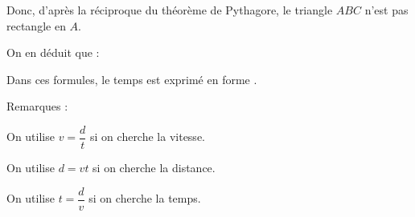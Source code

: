 \bigskip 

Donc, d'après la réciproque du théorème de Pythagore, le triangle $ABC$ n'est pas rectangle en $A$.                                
  
\newpage  

                 
                 

\begin{labeling}{On en déduit que :} 
\item [On en déduit que :] 
\item [et :]  
\end{labeling}    

\medskip

Dans ces formules, le temps est exprimé en forme .

\begin{labeling}[$\bullet$]{Remarques : }
\item [\underline{Remarques} : ] On utilise $v=\dfrac{d}{t}$ si on cherche la vitesse.   
\item [] On utilise $d=vt$ si on cherche la distance.   
\item [] On utilise $t=\dfrac{d}{v}$ si on cherche la temps.   
\end{labeling}

\bigskip
                   

                 \centerline{}   

\medskip                     
                 
